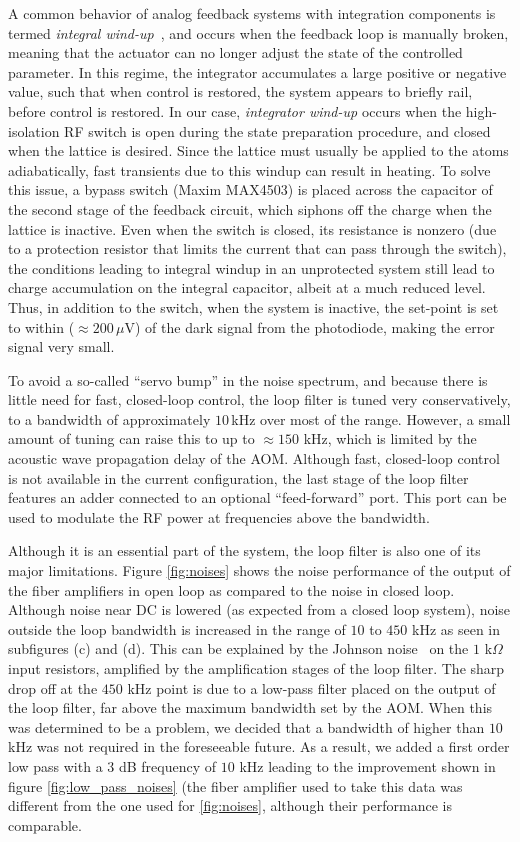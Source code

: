 \documentclass[twocolumn,aps,pra,showpacs,preprintnumbers,bibnotes]{revtex4-1}
\begin{document}
A common behavior of analog feedback systems with integration components is termed \textit{integral wind-up}~\cite{Bechhoefer2005}, and occurs when the feedback loop is manually broken, meaning that the actuator can no longer adjust the state of the controlled parameter. 
In this regime, the integrator accumulates a large positive or negative value, such that when control is restored, the system appears to briefly rail, before control is restored.
In our case, \textit{integrator wind-up} occurs when the high-isolation RF switch is open during the state preparation procedure, and closed when the lattice is desired. 
Since the lattice must usually be applied to the atoms adiabatically, fast transients due to this windup can result in heating.
To solve this issue, a bypass switch (Maxim MAX4503) is placed across the capacitor of the second stage of the feedback circuit, which siphons off the charge when the lattice is inactive.
Even when the switch is closed, its resistance is nonzero (due to a protection resistor that limits the current that can pass through the switch), the conditions leading to integral windup in an unprotected system still lead to charge accumulation on the integral capacitor, albeit at a much reduced level.
Thus, in addition to the switch, when the system is inactive, the set-point is set to within ($\approx 200\,\mu$V) of the dark signal from the photodiode, making the error signal very small.

To avoid a so-called ``servo bump'' in the noise spectrum, and because there is little need for fast, closed-loop control, the loop filter is tuned very conservatively, to a bandwidth of approximately $10\,$kHz over most of the range.
However, a small amount of tuning can raise this to up to $\approx150$ kHz, which is limited by the acoustic wave propagation delay of the AOM.
Although fast, closed-loop control is not available in the current configuration, the last stage of the loop filter features an adder connected to an optional ``feed-forward'' port. 
This port can be used to modulate the RF power at frequencies above the bandwidth.

Although it is an essential part of the system, the loop filter is also one of its major limitations. Figure \ref{fig:noises} shows the noise performance of the output of the fiber amplifiers in open loop as compared to the noise in closed loop. Although noise near DC is lowered (as expected from a closed loop system), noise outside the loop bandwidth is increased in the range of $10$ to $450$ kHz as seen in subfigures (c) and (d).
This can be explained by the Johnson noise~\cite{Horowitz2015} on the $1$ k$\Omega$ input resistors, amplified by the amplification stages of the loop filter.
The sharp drop off at the $450$ kHz point is due to a low-pass filter placed on the output of the loop filter, far above the maximum bandwidth set by the AOM.
When this was determined to be a problem, we decided that a bandwidth of higher than $10\,$ kHz was not required in the foreseeable future. 
As a result, we added a first order low pass with a $3$ dB frequency of $10$ kHz leading to the improvement shown in figure \ref{fig:low_pass_noises} (the fiber amplifier used to take this data was different from the one used for \ref{fig:noises}, although their performance is comparable.
\end{document}
